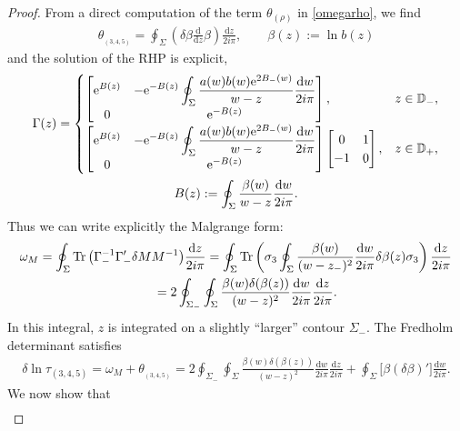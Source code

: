 \documentclass[pdftex]{sigma}
\numberwithin{equation}{section}
\def \ds{\displaystyle}
\def \s{\sigma}
\def \ddz{ \frac {\d z}{2i\pi}}
\def \ddw{ \frac {\d w}{2i\pi}}
\def\D{\mathbb D}
\def \G{\Gamma}
\def\d{\mathrm d}
\begin{document}
\begin{proof}
From a direct computation of the term $\theta_{(\rho)}$ in \eqref{omegarho}, we f\/ind
\begin{gather*}
 \theta_{_{(3,4,5)}} = \oint_{\Sigma}\left( \delta \beta \frac {\d}{\d z} \beta \right) \ddz ,\qquad \beta(z):= \ln b(z)
\end{gather*}
and the solution of the RHP is explicit,
\begin{gather*}
\Gamma(z) =
\begin{cases}
\ds \left[
\begin{matrix}
 \ds {\rm e}^{B(z)}
 &- \ds {\rm e}^{-B(z) } \oint_\Sigma \frac {a(w)b(w) {\rm e}^{2B_-(w)}}{w-z} \ddw
 \\
 0 & {\rm e}^{-B(z)}
\end{matrix}
\right],
 & z\in \D_-, \\
\ds \left[
\begin{matrix}
 \ds {\rm e}^{B(z)}
 &- \ds {\rm e}^{-B(z) } \oint_\Sigma \frac {a(w)b(w) {\rm e}^{2B_-(w)}}{w-z} \ddw
 \\
 0 & {\rm e}^{-B(z)}
\end{matrix}
\right]\left[
\begin{matrix}
0 & 1\\
-1 &0
\end{matrix}
\right],
 & z\in \D_+,
\end{cases}
\\
B(z) := \oint_{\Sigma} \frac {\beta(w)}{w-z} \frac{\d w}{2i\pi}.
\end{gather*}
Thus we can write explicitly the Malgrange form:
\begin{gather*}
\omega_M = \oint_\Sigma \operatorname{Tr} \big(\G_-^{-1} \G_-' \delta M M^{-1}\big) \ddz
= \oint_\Sigma \operatorname{Tr} \left(\s_3 \oint_{\Sigma} \frac {\beta(w)}{(w-z_-)^2} \ddw\delta \beta(z) \s_3\right) \ddz \\
\hphantom{\omega_M}{} = 2\oint_{\Sigma_-} \oint_{\Sigma} \frac {\beta(w)\delta (\beta(z))}{(w-z)^2} \ddw \ddz.
\end{gather*}
In this integral, $z$ is integrated on a slightly ``larger'' contour $\Sigma_-$. The Fredholm determinant satisf\/ies
\begin{gather*}
\delta \ln \tau_{(3,4,5)} =\omega_M+ \theta_{_{(3,4,5)}}= 2\oint_{\Sigma_-} \oint_{\Sigma} \frac {\beta(w)\delta (\beta(z))}{(w-z)^2} \ddw \ddz+
 \oint_\Sigma\big[ \beta (\delta \beta)' \big] \ddw.
\end{gather*}
We now show that
\begin{gather*}

\end{gather*}
\end{proof}
\end{document}
